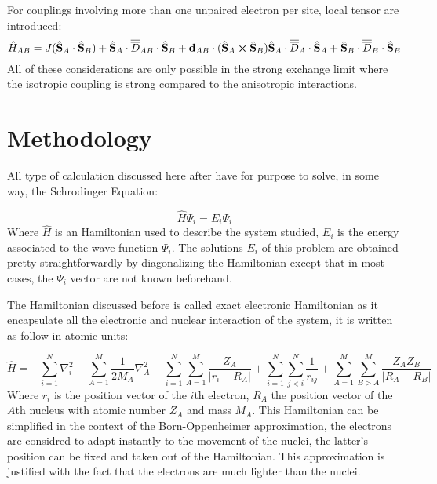 \documentclass{article}
\begin{document}
For couplings involving more than one unpaired electron per site, local tensor are introduced:
\begin{equation}
    \hat{H}_{AB}=J(\hat{\vb S}_A \cdot \hat{\vb S}_B) + \hat{\vb S}_A \cdot\overline{\overline{D}}_{AB} \cdot \hat{\vb S}_B + \vb{d}_{AB} \cdot (\hat{\vb S}_A \cross \hat{\vb S}_B) \hat{\vb S}_A \cdot\overline{\overline{D}}_{A} \cdot \hat{\vb S}_A +\hat{\vb S}_B \cdot\overline{\overline{D}}_{B} \cdot \hat{\vb S}_B
\end{equation}
All of these considerations are only possible in the strong exchange limit where the isotropic coupling is strong compared to the anisotropic interactions.

\section{Methodology}

All type of calculation discussed here after have for purpose to solve, in some way, the Schrodinger Equation:

\begin{equation}
    \hat{H}\Psi_i=E_i\Psi_i
\end{equation}
Where $\hat{H}$ is an Hamiltonian used to describe the system studied, $E_i$ is the energy associated to the wave-function $\Psi_i$. The solutions $E_i$ of this problem are obtained pretty straightforwardly by diagonalizing the Hamiltonian except that in most cases, the $\Psi_i$ vector are not known beforehand.

The Hamiltonian discussed before is called exact electronic Hamiltonian as it encapsulate all the electronic and nuclear interaction of the system, it is written as follow in atomic units:

\begin{equation}
    \hat{H}=-\sum_{i=1}^{N}\nabla_i^2-\sum_{A=1}^{M}\frac{1}{2M_A}\nabla_A^2%
    -\sum_{i=1}^{N}\sum_{A=1}^{M}\frac{Z_A}{|r_i-R_A|}+\sum_{i=1}^{N}\sum_{j<i}^{N}\frac{1}{r_{ij}}%
    +\sum_{A=1}^{M}\sum_{B>A}^{M}\frac{Z_A Z_B}{|R_A-R_B|}
\end{equation}
Where $r_i$ is the position vector of the $i$th electron, $R_A$ the position vector of the $A$th nucleus with atomic number $Z_A$ and mass $M_A$.
This Hamiltonian can be simplified in the context of the Born-Oppenheimer approximation, the electrons are considred to adapt instantly to the movement of the nuclei, the latter's position can be fixed and taken out of the Hamiltonian.
This approximation is justified with the fact that the electrons are much lighter than the nuclei. 
\end{document}
